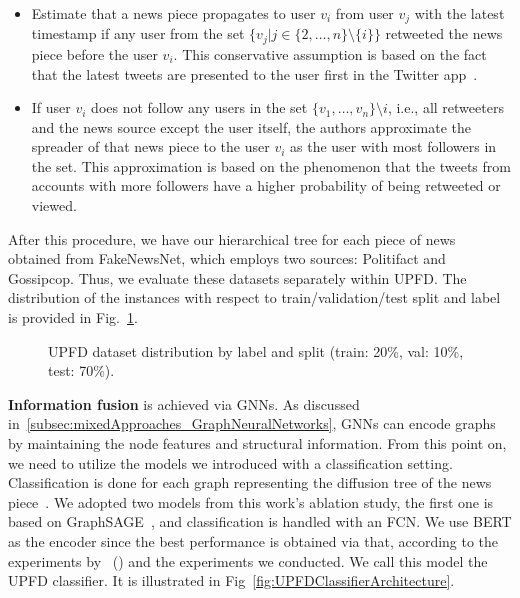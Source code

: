 \begin{itemize}
    \item Estimate that a news piece propagates to user $v_i$ from user $v_j$ with the latest timestamp if any user from the set $\{v_j | j\in \{2, \dots, n\}\setminus \{i\}\}$ retweeted the news piece before the user $v_i$. This conservative assumption is based on the fact that the latest tweets are presented to the user first in the Twitter app~\parencite{UPFD_Dataset_Shu}.
    \item If user $v_i$ does not follow any users in the set $\{v_1, \dots, v_n \} \setminus {i}$, i.e., all retweeters and the news source except the user itself, the authors approximate the spreader of that news piece to the user $v_i$ as the user with most followers in the set. This approximation is based on the phenomenon that the tweets from accounts with more followers have a higher probability of being retweeted or viewed.
\end{itemize}
After this procedure, we have our hierarchical tree for each piece of news obtained from FakeNewsNet, which employs two sources: Politifact and Gossipcop. Thus, we evaluate these datasets separately within UPFD. The distribution of the instances with respect to train/validation/test split and label is provided in Fig.~\ref{fig:UPFD_Dataset_Visualization}.\\
\begin{figure}
    \hfill
    \caption[UPFD dataset distribution by label and split.]{UPFD dataset distribution by label and split (train: 20\%, val: 10\%, test: 70\%).}
    \label{fig:UPFD_Dataset_Visualization}
\end{figure}
\textbf{Information fusion} is achieved via GNNs. As discussed in~\ref{subsec:mixedApproaches_GraphNeuralNetworks}, GNNs can encode graphs by maintaining the node features and structural information. From this point on, we need to utilize the models we introduced with a classification setting. Classification is done for each graph representing the diffusion tree of the news piece~\parencite{UPFD_Dataset_Shu}. We adopted two models from this work's ablation study, the first one is based on GraphSAGE~\parencite{GraphSAGE_Hamilton}, and classification is handled with an FCN. We use BERT as the encoder since the best performance is obtained via that, according to the experiments by~\citeauthor{UPFD_Dataset_Shu} (\citeyear{UPFD_Dataset_Shu}) and the experiments we conducted. We call this model the UPFD classifier. It is illustrated in Fig~\ref{fig:UPFDClassifierArchitecture}.\\
